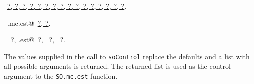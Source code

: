\documentclass[reqno]{amsart}
\renewcommand{\NWlink}[2]{\hyperlink{#1}{#2}}
\begin{document}
\begin{flushleft}
\begin{list}{}{\setlength{\itemsep}{-\parsep}\setlength{\itemindent}{-\leftmargin}}
\item \NWtxtFileDefBy\ \NWlink{nuweb?}{?}\NWlink{nuweb?}{, ?}\NWlink{nuweb?}{, ?}\NWlink{nuweb?}{, ?}\NWlink{nuweb?}{, ?}\NWlink{nuweb?}{, ?}\NWlink{nuweb?}{, ?}\NWlink{nuweb?}{, ?}\NWlink{nuweb?}{, ?}\NWlink{nuweb?}{, ?}\NWlink{nuweb?}{, ?}\NWlink{nuweb?}{, ?}\NWlink{nuweb?}{, ?}\NWlink{nuweb?}{, ?}\NWlink{nuweb?}{, ?}\NWlink{nuweb?}{, ?}.
\item \NWtxtIdentsDefed\nobreak\  \verb@SO.mc.est@\nobreak\ \NWlink{nuweb?}{?}\NWlink{nuweb?}{, ?}.\item \NWtxtIdentsUsed\nobreak\  \verb@DownUpMatrix@\nobreak\ \NWlink{nuweb?}{?}, \verb@mc.est@\nobreak\ \NWlink{nuweb?}{?}, \verb@ReprodISDM@\nobreak\ \NWlink{nuweb?}{?}, \verb@soControl@\nobreak\ \NWlink{nuweb?}{?}.
\item{}
\end{list}
\vspace{4ex}
\end{flushleft}
The values supplied in the call to \texttt{soControl} replace the defaults and 
a list with all possible arguments is returned. The returned list is used as 
the control argument to the \texttt{SO.mc.est} function.
\end{document}
